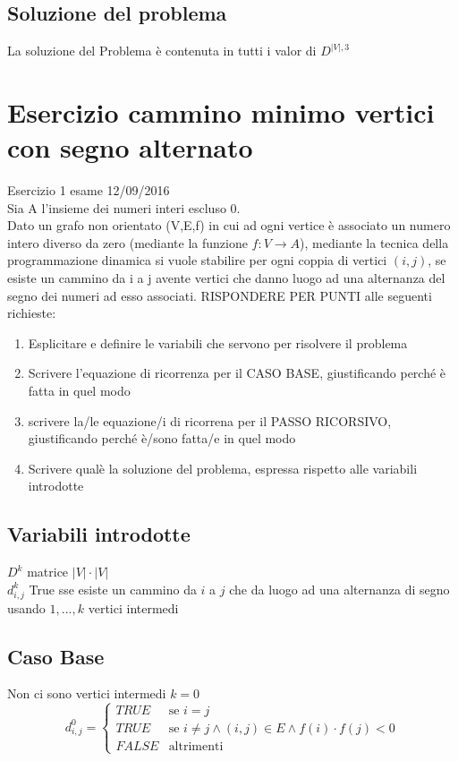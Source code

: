 \documentclass[12pt, a4paper, openany]{book}
\begin{document}
\subsection*{Soluzione del problema}
La soluzione del Problema è contenuta in tutti i valor di $D^{|V|,3}$

\section{Esercizio cammino minimo vertici con segno alternato} Esercizio 1 esame 12/09/2016\\
Sia A l'insieme dei numeri interi escluso 0.\\
Dato un grafo non orientato (V,E,f) in cui ad ogni vertice è associato un numero intero
diverso da zero (mediante la funzione $f: V\rightarrow A$), mediante la tecnica della
programmazione dinamica si vuole stabilire per ogni coppia di vertici $(i,j)$, se esiste un
cammino da i a j avente vertici che danno luogo ad una alternanza del segno dei numeri
ad esso associati. RISPONDERE PER PUNTI alle seguenti richieste:
\begin{enumerate}
	\item Esplicitare e definire le variabili che servono per risolvere il problema
	\item Scrivere l'equazione di ricorrenza per il CASO BASE, giustificando perché è fatta in quel modo
	\item scrivere la/le equazione/i di ricorrena per il PASSO RICORSIVO, giustificando perché è/sono fatta/e in quel modo
	\item Scrivere qualè la soluzione del problema, espressa rispetto alle variabili introdotte
\end{enumerate}

\subsection*{Variabili introdotte}
$D^k$ matrice $|V|\cdot|V|$
\\$d^k_{i,j}$ True sse esiste un cammino da $i$ a $j$ che da luogo ad una alternanza di segno usando ${1,...,k}$ vertici intermedi
	\subsection*{Caso Base} Non ci sono vertici intermedi $k=0$
	\begin{equation*}
		d^0_{i,j} = \begin{cases}
			TRUE  & \text{se $i=j$}                                                  \\
			TRUE  & \text{se $i\neq j \land (i,j) \in E \land f(i) \cdot f(j) < 0 $} \\
			FALSE & \text{altrimenti}
		\end{cases}
	\end{equation*}
\end{document}
